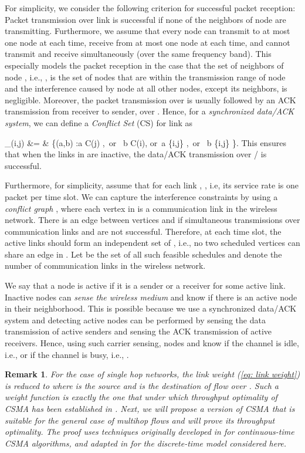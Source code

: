 \documentclass[10pt,onecolumn,draftclsnofoot,journal]{IEEEtran}
\newtheorem{remark}{Remark}
\newcommand{\be}{}
\begin{document}
For simplicity, we consider the following criterion for successful packet reception: Packet transmission over link  is successful if none of the neighbors of node  are transmitting. Furthermore, we assume that every node can transmit to at most one node at each time, receive from at most one node at each time, and cannot transmit and receive simultaneously (over the same frequency band). This especially models the packet reception in the case that the set of neighbors of node , i.e., , is the set of nodes that are within the transmission range of node  and the interference caused by node  at all other nodes, except its neighbors, is negligible. Moreover, the packet transmission over  is usually followed by an ACK transmission from receiver to sender, over . Hence, for a \textit{synchronized data/ACK system}, we can define a \textit{Conflict Set} (CS) for link  as
\be
{}_{(i,j)} &= & \Big\{(a,b) \in {}:a \in C(j) \mbox{, or } b \in C(i),  \mbox{or }a \in \{i,j\} \mbox{, or } b \in \{i,j\} \Big\}.
\ee
This ensures that when the links in  are inactive, the data/ACK transmission over /  is successful.

Furthermore, for simplicity, assume that for each link , , i.e, its service rate is one packet per time slot.
We can capture the interference constraints by using a \textit{conflict graph} , where each vertex in  is a communication link in the wireless network. There is an edge  between vertices  and  if simultaneous transmissions over communication links  and  are not successful. Therefore, at each time slot, the active links should form an independent set of , i.e., no two scheduled vertices can share an edge in . Let  be the set of all such feasible schedules and  denote the number of communication links in the wireless network.





We say that a node is active if it is a sender or a receiver for some active link. Inactive nodes can \textit{sense the wireless medium} and know if there is an active node in their neighborhood. This is possible because we use a synchronized data/ACK system and detecting active nodes can be performed by sensing the data transmission of active senders and sensing the ACK transmission of active receivers. Hence, using such carrier sensing, nodes  and  know if the channel is idle, i.e.,  or if the channel is busy, i.e., .
\begin{remark}
For the case of single hop networks, the link weight (\ref{eq: link weight}) is reduced to  where  is the source and  is the destination of flow over . Such a weight function is exactly the one that under which throughput optimality of CSMA has been established in \cite{ghaderi}.
Next, we will propose a version of CSMA that is suitable for the general case of multihop flows and will prove its throughput optimality. The proof uses techniques originally developed in \cite{shah, shah2} for continuous-time CSMA algorithms, and adapted in \cite{ghaderi} for the discrete-time model considered here.
\end{remark}
\end{document}
